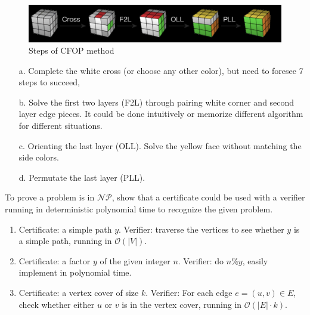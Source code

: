 \documentclass{assignment}
\begin{document}
\begin{homeworkProblem}
\begin{enumerate}
\begin{figure}[!ht]
\centering
\includegraphics[scale=0.6]{cube2.png}
\caption{Steps of CFOP method}
\label{fig:cfop}
\end{figure}
\begin{enumerate}
\item[a.] Complete the white cross (or choose any other color), but need to foresee 7 steps to succeed, 

\item[b.] Solve the first two layers (F2L) through pairing white corner and second layer edge pieces. It could be done intuitively or memorize different algorithm for different situations. 
\item[c.] Orienting the last layer (OLL). Solve the yellow face without matching the side colors. 
\item[d.] Permutate the last layer (PLL).  
\end{enumerate}

\end{enumerate}    



    
    \end{homeworkProblem}
        \begin{homeworkProblem}
        To prove a problem is in $\mathcal{NP}$, show that a certificate could be used with a verifier running in deterministic polynomial time to recognize the given problem. 
        \begin{enumerate}
        \item Certificate: a simple path $y$. Verifier: traverse the vertices to see whether $y$ is a simple path, running in $\mathcal{O}(|V|)$.
        \item Certificate: a factor $y$ of the given integer $n$. Verifier: do $n \% y$, easily implement in polynomial time.
        \item Certificate: a vertex cover of size $k$. Verifier: For each edge $e=(u,v) \in E$, check whether either $u$ or $v$ is in the vertex cover, running in $\mathcal{O}(|E|\cdot k )$.
          
        \end{enumerate}
\end{homeworkProblem}
    
\end{document}
